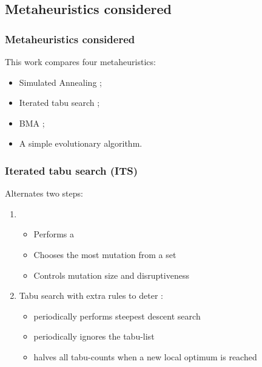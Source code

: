 \subsection{Metaheuristics considered} {
    \subsubsection{Metaheuristics considered} {
        This work compares four metaheuristics:
        \begin{itemize}
            \item Simulated Annealing \citep{kirkpatrick:1983op, vcerny:1985th};
            \item Iterated tabu search \citep{Misevicius:2012dj};
            \item BMA \citep{Benlic:2015gp};
            \item A simple evolutionary algorithm.
        \end{itemize}
    }

    \subsubsection{Iterated tabu search (ITS) \citep{Misevicius:2012dj}} {
        Alternates two steps:
        \begin{enumerate}
            \item {}
                \begin{itemize}
                    \item Performs a 
                    \item Chooses the most  mutation from a set
                    \item Controls mutation size and disruptiveness
                \end{itemize}
            \item {}
                Tabu search with extra rules to deter :
                \begin{itemize}
                    \item periodically performs steepest descent search
                    \item periodically ignores the tabu-list
                    \item halves all tabu-counts when a new local optimum is reached
                \end{itemize}
        \end{enumerate}
    }

}
